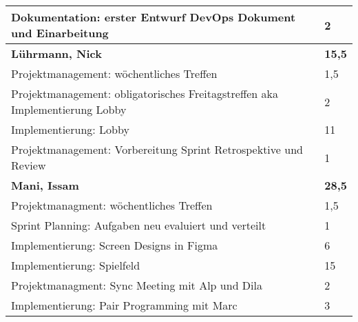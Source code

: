 \documentclass[a4paper,11pt]{scrartcl}
\begin{document}
\begin{longtable}{| p{13.8cm} | C{2.4cm} |}
  Dokumentation: erster Entwurf DevOps Dokument und Einarbeitung
	&
  2
	\\
	\hline
	\hline


	\textbf{Lührmann, Nick} & \textbf{15,5}\\ %
	\hline

	Projektmanagement: wöchentliches Treffen
	&
	1,5
	\\
	\hline

	Projektmanagement: obligatorisches Freitagstreffen aka Implementierung Lobby
	&
  2
	\\
	\hline

  Implementierung: Lobby
	&
  11
	\\
	\hline

  Projektmanagement: Vorbereitung Sprint Retrospektive und Review
	&
  1
	\\
	\hline
	\hline


	\textbf{Mani, Issam} & \textbf{28,5}\\ %
	\hline

  Projektmanagment: wöchentliches Treffen
	&
  1,5
	\\
	\hline
	
  Sprint Planning: Aufgaben neu evaluiert und verteilt
	&
  1
	\\
	\hline
	
  Implementierung: Screen Designs in Figma
	&
  6
	\\
	\hline
	
  Implementierung: Spielfeld
	&
  15
	\\
	\hline
	
  Projektmanagment: Sync Meeting mit Alp und Dila
	&
  2
	\\
	\hline
	
  Implementierung: Pair Programming mit Marc
	&
  3
	\\
	\hline
	\hline



\end{longtable}
\end{document}
